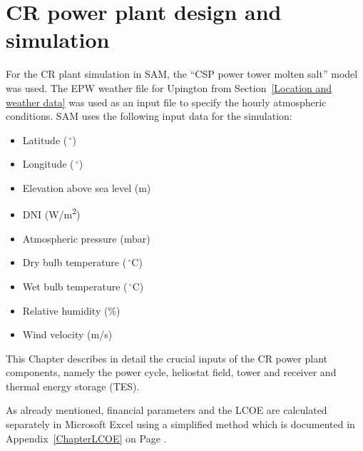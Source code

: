 \section{CR power plant design  and simulation} \label{CR power plant design  and simulation}
For the CR plant simulation in SAM, the \enquote{CSP power tower molten salt} model was used. The EPW weather file for Upington from Section~\ref{Location and weather data} was used as an input file to specify the hourly atmospheric conditions. SAM uses the following input data for the simulation:
\begin{itemize}
\item Latitude ($\,^{\circ}$)
\item Longitude ($\,^{\circ}$)
\item Elevation above sea level (m)
\item DNI (W/m\textsuperscript{2})
\item Atmospheric pressure (mbar)
\item Dry bulb temperature ($\,^{\circ}\mathrm{C}$)
\item Wet bulb temperature ($\,^{\circ}\mathrm{C}$)
\item Relative humidity (\%)
\item Wind velocity (m/s)
\end{itemize}
This Chapter describes in detail the crucial inputs of the CR power plant components, namely the power cycle, heliostat field, tower and receiver and thermal energy storage (TES).

As already mentioned, financial parameters and the LCOE are calculated separately in Microsoft Excel using a simplified method which is documented in Appendix~\ref{ChapterLCOE} on Page \pageref{ChapterLCOE}.

